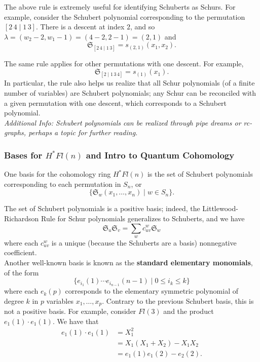 The above rule is extremely useful for identifying Schuberts as Schurs. For example, consider the Schubert polynomial corresponding to the permutation $[2\,4 \mid 1\,3]$. There is a descent at index $2$, and so $\lambda = (w_2 - 2, w_1 - 1) = (4 - 2, 2 - 1) = (2, 1)$ and
\[
    \mathfrak{S}_{[2\,4 \mid 1\,3]} = s_{(2, 1)}(x_1, x_2).
\]

The same rule applies for other permutations with one descent. For example, 
\[
    \mathfrak{S}_{[2 \mid 1\,3\,4]} = s_{(1)}(x_1).
\]
In particular, the rule also helps us realize that all Schur polynomials (of a finite number of variables) are Schubert polynomials; any Schur can be reconciled with a given permutation with one descent, which corresponds to a Schubert polynomial. \\

\textit{Additional Info: Schubert polynomials can be realized through pipe dreams or rc-graphs, perhaps a topic for further reading.}

\subsubsection{Bases for $H^* Fl(n)$ and Intro to Quantum Cohomology}

One basis for the cohomology ring $H^* Fl(n)$ is the set of Schubert polynomials corresponding to each permutation in $S_n$, or
\[
    \{ \mathfrak{S}_w(x_1, \dots, x_n) \mid w \in S_n \}.
\]

The set of Schubert polynomials is a positive basis; indeed, the Littlewood-Richardson Rule for Schur polynomials generalizes to Schuberts, and we have
\[
    \mathfrak{S}_u \mathfrak{S}_v = \sum_{w} c_{uv}^w \mathfrak{S}_w
\]
where each $c_{uv}^w$ is a unique (because the Schuberts are a basis) nonnegative coefficient. \\

Another well-known basis is known as the \textbf{standard elementary monomials}, of the form
\[
    \{e_{i_1}(1) \cdots e_{i_{n-1}}(n-1) \mid 0 \leq i_k \leq k \}
\]
where each $e_k(p)$ corresponds to the elementary symmetric polynomial of degree $k$ in $p$ variables $x_1, \dots, x_p$. Contrary to the previous Schubert basis, this is not a positive basis. For example, consider $Fl(3)$ and the product $e_1(1) \cdot e_1(1).$ We have that
\begin{align*}
    e_1(1) \cdot e_1(1) &= X_1^2 \\
    &= X_1(X_1 + X_2) - X_1X_2 \\
    &= e_1(1)e_1(2) - e_2(2).
\end{align*}

